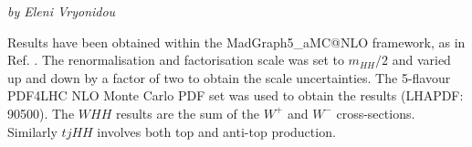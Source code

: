 \begin{center}
    \textit{by Eleni Vryonidou}
\end{center}

\begin{table}[h!]
\renewcommand{\arraystretch}{1.6}
\begin{center}
 \label{table:xsec2}
 \caption{Signal cross section (in fb) for HH production at NLO QCD.}  
\end{center} 
\end{table}
Results have been obtained within the {\sc MadGraph5\_aMC@NLO} \cite{Alwall:2014hca} framework, as in Ref. \cite{Frederix:2014hta}. The renormalisation and factorisation scale was set to $m_{HH}/2$ and varied up and down by a factor of two to obtain the scale uncertainties. The 5-flavour PDF4LHC NLO Monte Carlo PDF set was used to obtain the results (LHAPDF: 90500). The $WHH$ results are the sum of the $W^+$ and $W^-$ cross-sections. Similarly $tjHH$ involves both top and anti-top production. 
